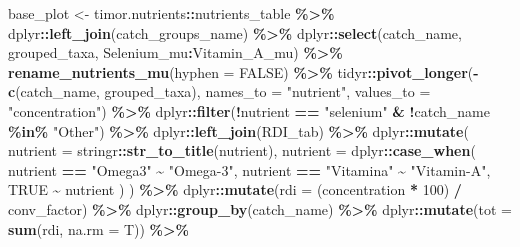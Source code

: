 \documentclass[
]{book}
\newenvironment{Shaded}{\begin{snugshade}}{\end{snugshade}}
\newcommand{\AttributeTok}[1]{\textcolor[rgb]{0.13,0.29,0.53}{#1}}
\newcommand{\ConstantTok}[1]{\textcolor[rgb]{0.56,0.35,0.01}{#1}}
\newcommand{\DecValTok}[1]{\textcolor[rgb]{0.00,0.00,0.81}{#1}}
\newcommand{\FunctionTok}[1]{\textcolor[rgb]{0.13,0.29,0.53}{\textbf{#1}}}
\newcommand{\NormalTok}[1]{#1}
\newcommand{\OtherTok}[1]{\textcolor[rgb]{0.56,0.35,0.01}{#1}}
\newcommand{\SpecialCharTok}[1]{\textcolor[rgb]{0.81,0.36,0.00}{\textbf{#1}}}
\newcommand{\StringTok}[1]{\textcolor[rgb]{0.31,0.60,0.02}{#1}}
\begin{document}
\begin{Shaded}
\begin{Highlighting}[]
\NormalTok{base\_plot }\OtherTok{\textless{}{-}}
\NormalTok{  timor.nutrients}\SpecialCharTok{::}\NormalTok{nutrients\_table }\SpecialCharTok{\%\textgreater{}\%}
\NormalTok{  dplyr}\SpecialCharTok{::}\FunctionTok{left\_join}\NormalTok{(catch\_groups\_name) }\SpecialCharTok{\%\textgreater{}\%}
\NormalTok{  dplyr}\SpecialCharTok{::}\FunctionTok{select}\NormalTok{(catch\_name, grouped\_taxa, Selenium\_mu}\SpecialCharTok{:}\NormalTok{Vitamin\_A\_mu) }\SpecialCharTok{\%\textgreater{}\%}
  \FunctionTok{rename\_nutrients\_mu}\NormalTok{(}\AttributeTok{hyphen =} \ConstantTok{FALSE}\NormalTok{) }\SpecialCharTok{\%\textgreater{}\%}
\NormalTok{  tidyr}\SpecialCharTok{::}\FunctionTok{pivot\_longer}\NormalTok{(}\SpecialCharTok{{-}}\FunctionTok{c}\NormalTok{(catch\_name, grouped\_taxa), }\AttributeTok{names\_to =} \StringTok{"nutrient"}\NormalTok{, }\AttributeTok{values\_to =} \StringTok{"concentration"}\NormalTok{) }\SpecialCharTok{\%\textgreater{}\%}
\NormalTok{  dplyr}\SpecialCharTok{::}\FunctionTok{filter}\NormalTok{(}\SpecialCharTok{!}\NormalTok{nutrient }\SpecialCharTok{==} \StringTok{"selenium"} \SpecialCharTok{\&} \SpecialCharTok{!}\NormalTok{catch\_name }\SpecialCharTok{\%in\%} \StringTok{"Other"}\NormalTok{) }\SpecialCharTok{\%\textgreater{}\%}
\NormalTok{  dplyr}\SpecialCharTok{::}\FunctionTok{left\_join}\NormalTok{(RDI\_tab) }\SpecialCharTok{\%\textgreater{}\%}
\NormalTok{  dplyr}\SpecialCharTok{::}\FunctionTok{mutate}\NormalTok{(}
    \AttributeTok{nutrient =}\NormalTok{ stringr}\SpecialCharTok{::}\FunctionTok{str\_to\_title}\NormalTok{(nutrient),}
    \AttributeTok{nutrient =}\NormalTok{ dplyr}\SpecialCharTok{::}\FunctionTok{case\_when}\NormalTok{(}
\NormalTok{      nutrient }\SpecialCharTok{==} \StringTok{"Omega3"} \SpecialCharTok{\textasciitilde{}} \StringTok{"Omega{-}3"}\NormalTok{,}
\NormalTok{      nutrient }\SpecialCharTok{==} \StringTok{"Vitamina"} \SpecialCharTok{\textasciitilde{}} \StringTok{"Vitamin{-}A"}\NormalTok{,}
      \ConstantTok{TRUE} \SpecialCharTok{\textasciitilde{}}\NormalTok{ nutrient}
\NormalTok{    )}
\NormalTok{  ) }\SpecialCharTok{\%\textgreater{}\%}
\NormalTok{  dplyr}\SpecialCharTok{::}\FunctionTok{mutate}\NormalTok{(}\AttributeTok{rdi =}\NormalTok{ (concentration }\SpecialCharTok{*} \DecValTok{100}\NormalTok{) }\SpecialCharTok{/}\NormalTok{ conv\_factor) }\SpecialCharTok{\%\textgreater{}\%}
\NormalTok{  dplyr}\SpecialCharTok{::}\FunctionTok{group\_by}\NormalTok{(catch\_name) }\SpecialCharTok{\%\textgreater{}\%}
\NormalTok{  dplyr}\SpecialCharTok{::}\FunctionTok{mutate}\NormalTok{(}\AttributeTok{tot =} \FunctionTok{sum}\NormalTok{(rdi, }\AttributeTok{na.rm =}\NormalTok{ T)) }\SpecialCharTok{\%\textgreater{}\%}

\end{Highlighting}
\end{Shaded}
\end{document}
